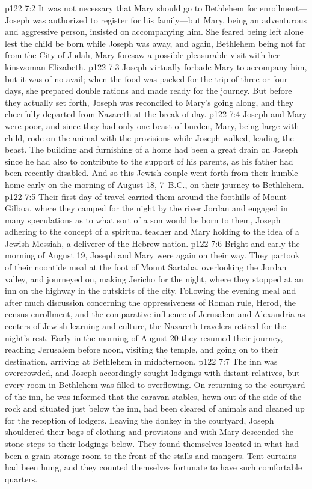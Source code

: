 \vs p122 7:2 It was not necessary that Mary should go to Bethlehem for enrollment---Joseph was authorized to register for his family---but Mary, being an adventurous and aggressive person, insisted on accompanying him. She feared being left alone lest the child be born while Joseph was away, and again, Bethlehem being not far from the City of Judah, Mary foresaw a possible pleasurable visit with her kinswoman Elizabeth.
\vs p122 7:3 Joseph virtually forbade Mary to accompany him, but it was of no avail; when the food was packed for the trip of three or four days, she prepared double rations and made ready for the journey. But before they actually set forth, Joseph was reconciled to Mary’s going along, and they cheerfully departed from Nazareth at the break of day.
\vs p122 7:4 Joseph and Mary were poor, and since they had only one beast of burden, Mary, being large with child, rode on the animal with the provisions while Joseph walked, leading the beast. The building and furnishing of a home had been a great drain on Joseph since he had also to contribute to the support of his parents, as his father had been recently disabled. And so this Jewish couple went forth from their humble home early on the morning of August 18, 7~B.C., on their journey to Bethlehem.
\vs p122 7:5 Their first day of travel carried them around the foothills of Mount Gilboa, where they camped for the night by the river Jordan and engaged in many speculations as to what sort of a son would be born to them, Joseph adhering to the concept of a spiritual teacher and Mary holding to the idea of a Jewish Messiah, a deliverer of the Hebrew nation.
\vs p122 7:6 Bright and early the morning of August 19, Joseph and Mary were again on their way. They partook of their noontide meal at the foot of Mount Sartaba, overlooking the Jordan valley, and journeyed on, making Jericho for the night, where they stopped at an inn on the highway in the outskirts of the city. Following the evening meal and after much discussion concerning the oppressiveness of Roman rule, Herod, the census enrollment, and the comparative influence of Jerusalem and Alexandria as centers of Jewish learning and culture, the Nazareth travelers retired for the night’s rest. Early in the morning of August 20 they resumed their journey, reaching Jerusalem before noon, visiting the temple, and going on to their destination, arriving at Bethlehem in midafternoon.
\vs p122 7:7 The inn was overcrowded, and Joseph accordingly sought lodgings with distant relatives, but every room in Bethlehem was filled to overflowing. On returning to the courtyard of the inn, he was informed that the caravan stables, hewn out of the side of the rock and situated just below the inn, had been cleared of animals and cleaned up for the reception of lodgers. Leaving the donkey in the courtyard, Joseph shouldered their bags of clothing and provisions and with Mary descended the stone steps to their lodgings below. They found themselves located in what had been a grain storage room to the front of the stalls and mangers. Tent curtains had been hung, and they counted themselves fortunate to have such comfortable quarters.
